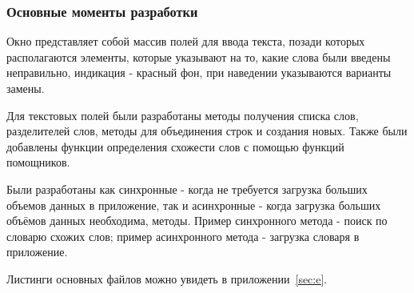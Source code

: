 \subsubsection{Основные моменты разработки}

Окно представляет собой массив полей для ввода текста, позади которых располагаются элементы, которые указывают на то, какие слова были введены неправильно, индикация - красный фон, при наведении указываются варианты замены.

Для текстовых полей были разработаны методы получения списка слов, разделителей слов, методы для объединения строк и создания новых. Также были добавлены функции определения схожести слов с помощью функций помощников.

Были разработаны как синхронные - когда не требуется загрузка больших объемов данных в приложение, так и асинхронные - когда загрузка больших объёмов данных необходима, методы. Пример синхронного метода - поиск по словарю схожих слов; пример асинхронного метода - загрузка словаря в приложение.

Листинги основных файлов можно увидеть в приложении~\ref{sec:e}.